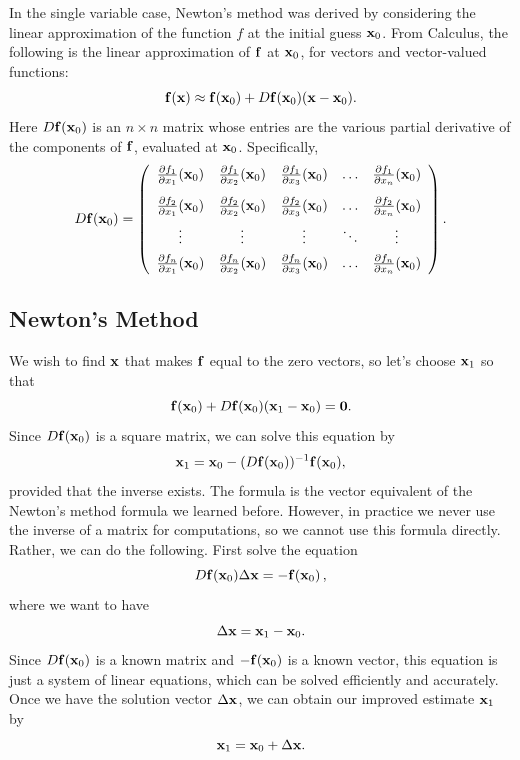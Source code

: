 In the single variable case, Newton's method was derived
by considering the linear approximation of the function $f$ at
the initial guess $\mathbf{x}_0$.
From Calculus, the following is the linear approximation of
$\mathbf{f}$ at $\mathbf{x}_0$, for vectors and vector-valued functions:
$$
\mathbf{f}(\mathbf{x}) \approx \mathbf{f}(\mathbf{x}_0) + D\mathbf{f}(\mathbf{x}_0) (\mathbf{x} - \mathbf{x}_0).
$$
Here $D\mathbf{f}(\mathbf{x}_0)$ is an $n \times n$ matrix whose entries are the
various partial derivative of the components of $\mathbf{f}$, evaluated at
\(\mathbf{x}_0\). Specifically,
\begin{equation}
  \label{eq:Df}
   D\fb(\xb_0) = \left( \begin{array}{ccccc}
     \frac{\partial f_1}{\partial x_1}(\xb_0) & \frac{\partial f_1}{\partial x_2}(\xb_0) &
              \frac{\partial f_1}{\partial x_3}(\xb_0) & \ldots & \frac{\partial f_1}{\partial x_n}(\xb_0) \vspace*{.3cm} \\

     \frac{\partial f_2}{\partial x_1}(\xb_0) & \frac{\partial f_2}{\partial x_2}(\xb_0) &
              \frac{\partial f_2}{\partial x_3}(\xb_0) & \ldots & \frac{\partial f_2}{\partial x_n}(\xb_0) \vspace*{.15cm}\\
        \vdots & \vdots  & \vdots & \ddots & \vdots \vspace*{.15cm}\\
     \frac{\partial f_n}{\partial x_1}(\xb_0) & \frac{\partial f_n}{\partial x_2}(\xb_0) &
              \frac{\partial f_n}{\partial x_3}(\xb_0) & \ldots & \frac{\partial f_n}{\partial x_n}(\xb_0)
                       \end{array} \right).  
\end{equation}


\subsection*{Newton's Method}

We wish to find $\mathbf{x}$ that makes $\mathbf{f}$ equal to the zero vectors, so
let's choose $\mathbf{x}_1$ so that
$$
  \mathbf{f}(\mathbf{x}_0) + D\mathbf{f}(\mathbf{x}_0) (\mathbf{x}_1 -\mathbf{x}_0) = \mathbf{0}.
$$
Since $D\mathbf{f}(\mathbf{x}_0)$ is a square matrix, we can solve this equation
by
$$
\mathbf{x}_1 = \mathbf{x}_0 - (D\mathbf{f}(\mathbf{x}_0))^{-1} \mathbf{f}(\mathbf{x}_0),
$$
provided that the inverse exists. The formula is the vector equivalent
of the Newton's method formula we learned before.
However, in practice we never use the inverse of a matrix for
computations, so we cannot use this formula directly. Rather,
we can do the following. First solve the equation
\begin{equation}
D\mathbf{f}(\mathbf{x}_0) \Delta \mathbf{x} = -\mathbf{f}(\mathbf{x}_0)\,,
\end{equation}
where we want to have
$$
\Delta \mathbf{x} = \mathbf{x}_1 - \mathbf{x}_0.
$$
Since $D\mathbf{f}(\mathbf{x}_0)$ is a known matrix and $-\mathbf{f}(\mathbf{x}_0)$ is a known
vector, this equation is just a system of linear equations,
which can be solved efficiently and accurately. Once we have the
solution vector $\Delta \mathbf{x}$, we can obtain our improved estimate
$\mathbf{x}_1$ by
$$
   \mathbf{x}_1 = \mathbf{x}_0 + \Delta \mathbf{x}.
$$

